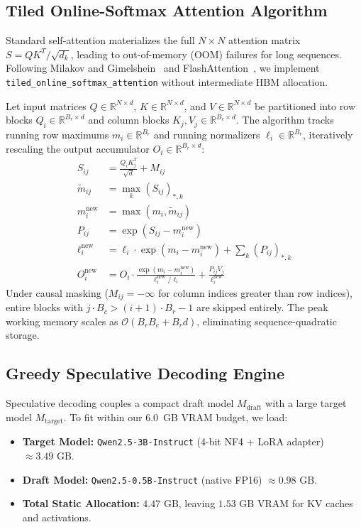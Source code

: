 \documentclass[conference]{IEEEtran}
\begin{document}
\subsection{Tiled Online-Softmax Attention Algorithm}
Standard self-attention materializes the full $N \times N$ attention matrix $S = Q K^T / \sqrt{d_k}$, leading to out-of-memory (OOM) failures for long sequences. Following Milakov and Gimelshein~\cite{milakov2018online} and FlashAttention~\cite{dao2022flashattention}, we implement \texttt{tiled\_online\_softmax\_attention} without intermediate HBM allocation.

Let input matrices $Q \in \mathbb{R}^{N \times d}$, $K \in \mathbb{R}^{N \times d}$, and $V \in \mathbb{R}^{N \times d}$ be partitioned into row blocks $Q_i \in \mathbb{R}^{B_r \times d}$ and column blocks $K_j, V_j \in \mathbb{R}^{B_c \times d}$. The algorithm tracks running row maximums $m_i \in \mathbb{R}^{B_r}$ and running normalizers $\ell_i \in \mathbb{R}^{B_r}$, iteratively rescaling the output accumulator $O_i \in \mathbb{R}^{B_r \times d}$:
\begin{align}
    S_{ij} &= \frac{Q_i K_j^T}{\sqrt{d}} + M_{ij} \\
    \tilde{m}_{ij} &= \max_{k} (S_{ij})_{*, k} \\
    m_i^{\text{new}} &= \max(m_i, \tilde{m}_{ij}) \\
    P_{ij} &= \exp(S_{ij} - m_i^{\text{new}}) \\
    \ell_i^{\text{new}} &= \ell_i \cdot \exp(m_i - m_i^{\text{new}}) + \sum_k (P_{ij})_{*, k} \\
    O_i^{\text{new}} &= O_i \cdot \frac{\exp(m_i - m_i^{\text{new}})}{\ell_i^{\text{new}} / \ell_i} + \frac{P_{ij} V_j}{\ell_i^{\text{new}}}
\end{align}
Under causal masking ($M_{ij} = -\infty$ for column indices greater than row indices), entire blocks with $j \cdot B_c > (i+1) \cdot B_r - 1$ are skipped entirely. The peak working memory scales as $\mathcal{O}(B_r B_c + B_r d)$, eliminating sequence-quadratic storage.

\subsection{Greedy Speculative Decoding Engine}
Speculative decoding couples a compact draft model $M_{\text{draft}}$ with a large target model $M_{\text{target}}$. To fit within our 6.0~GB VRAM budget, we load:
\begin{itemize}
    \item \textbf{Target Model:} \texttt{Qwen2.5-3B-Instruct} (4-bit NF4 + LoRA adapter) $\approx 3.49\text{ GB}$.
    \item \textbf{Draft Model:} \texttt{Qwen2.5-0.5B-Instruct} (native FP16) $\approx 0.98\text{ GB}$.
    \item \textbf{Total Static Allocation:} $4.47\text{ GB}$, leaving $1.53\text{ GB}$ VRAM for KV caches and activations.
\end{itemize}
\end{document}
